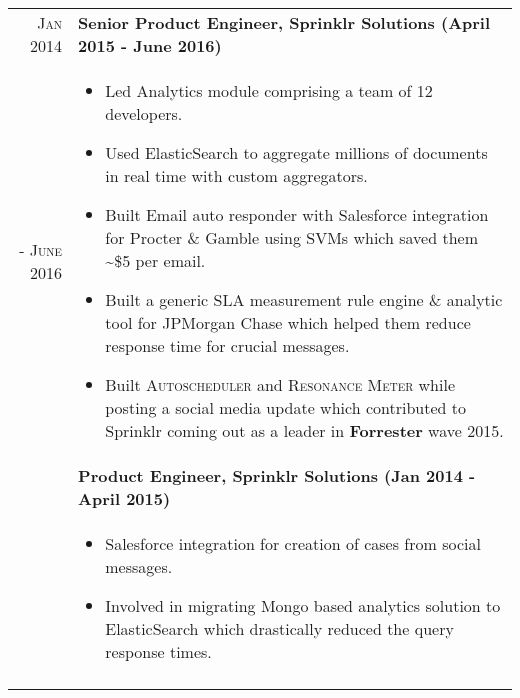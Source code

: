 \documentclass[a4paper,10pt]{article}
\begin{document}
\begin{tabular}{r|p{16cm}}
 \textsc{Jan 2014 } & \textbf{Senior Product Engineer, Sprinklr Solutions (April 2015 - June 2016)} \\\textsc{- June 2016}&
 \begin{itemize}[noitemsep]
 \item Led Analytics module comprising a team of 12 developers.
 \item Used ElasticSearch to aggregate millions of documents in real time with custom aggregators.
 \item Built Email auto responder with Salesforce integration for Procter \& Gamble using SVMs which saved them \textasciitilde\$5 per email.
 \item Built a generic SLA measurement rule engine \& analytic tool for JPMorgan Chase which helped them reduce response time for crucial messages.
 \item Built \textsc{Autoscheduler} and \textsc{Resonance Meter} while posting a social media update which contributed to Sprinklr coming out as a leader in \textbf{Forrester} wave 2015.
 \end{itemize}
 \\&
 \textbf{Product Engineer, Sprinklr Solutions (Jan 2014 - April 2015)} \\&
 \begin{itemize}[noitemsep]
 \item Salesforce integration for creation of cases from social messages.
 \item Involved in migrating Mongo based analytics solution to ElasticSearch which drastically reduced the query response times.
 \end{itemize}
 \\\multicolumn{2}{c}{} \\
\end{tabular}


\end{document}
